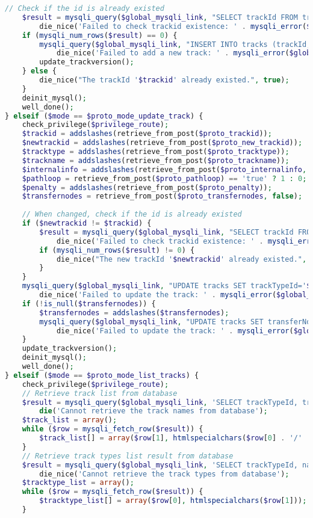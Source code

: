 \begin{lstlisting}[language=PHP,basicstyle=\tiny,caption=handle.php]
	// Check if the id is already existed
	$result = mysqli_query($global_mysqli_link, "SELECT trackId FROM tracks WHERE trackId='$trackid'") or
		die_nice('Failed to check trackid existence: ' . mysqli_error($global_mysqli_link), true);
	if (mysqli_num_rows($result) == 0) {
		mysqli_query($global_mysqli_link, "INSERT INTO tracks (trackId, trackTypeId, trackName, penalty, internalInfo) VALUES ('$trackid','$tracktype','$trackname','$penalty','$internalinfo')") or
			die_nice('Failed to add a new track: ' . mysqli_error($global_mysqli_link), true);
		update_trackversion();
	} else {
		die_nice("The trackId '$trackid' already existed.", true);
	}
	deinit_mysql();
	well_done();
} elseif ($mode == $proto_mode_update_track) {
	check_privilege($privilege_route);
	$trackid = addslashes(retrieve_from_post($proto_trackid));
	$newtrackid = addslashes(retrieve_from_post($proto_new_trackid));
	$tracktype = addslashes(retrieve_from_post($proto_tracktype));
	$trackname = addslashes(retrieve_from_post($proto_trackname));
	$internalinfo = addslashes(retrieve_from_post($proto_internalinfo, false)) or $internalinfo = '';
	$pathloop = retrieve_from_post($proto_pathloop) == 'true' ? 1 : 0;
	$penalty = addslashes(retrieve_from_post($proto_penalty));
	$transfernodes = retrieve_from_post($proto_transfernodes, false);
	
	// When changed, check if the id is already existed
	if ($newtrackid != $trackid) {
		$result = mysqli_query($global_mysqli_link, "SELECT trackId FROM tracks WHERE trackId='$newtrackid'") or
			die_nice('Failed to check trackid existence: ' . mysqli_error($global_mysqli_link), true);
		if (mysqli_num_rows($result) != 0) {
			die_nice("The new trackId '$newtrackid' already existed.", true);
		}
	}
	mysqli_query($global_mysqli_link, "UPDATE tracks SET trackTypeId='$tracktype', trackId='$newtrackid', trackName='$trackname', internalInfo='$internalinfo', pathloop='$pathloop', penalty='$penalty' WHERE trackId='$trackid'") or
		die_nice('Failed to update the track: ' . mysqli_error($global_mysqli_link));
	if (!is_null($transfernodes)) {
		$transfernodes = addslashes($transfernodes);
		mysqli_query($global_mysqli_link, "UPDATE tracks SET transferNodes='$transfernodes'WHERE trackId='$trackid'") or
			die_nice('Failed to update the track: ' . mysqli_error($global_mysqli_link));
	}
	update_trackversion();
	deinit_mysql();
	well_done();
} elseif ($mode == $proto_mode_list_tracks) {
	check_privilege($privilege_route);
	// Retrieve track list from database
	$result = mysqli_query($global_mysqli_link, 'SELECT trackTypeId, trackId, trackName FROM tracks ORDER BY trackTypeId, trackId') or
		die('Cannot retrieve the track names from database');
	$track_list = array();	
	while ($row = mysqli_fetch_row($result)) {
		$track_list[] = array($row[1], htmlspecialchars($row[0] . '/' . $row[2]));
	}
	// Retrieve track types list result from database
	$result = mysqli_query($global_mysqli_link, 'SELECT trackTypeId, name FROM tracktypes ORDER BY trackTypeId') or
		die_nice('Cannot retrieve the track types from database');
	$tracktype_list = array();
	while ($row = mysqli_fetch_row($result)) {
		$tracktype_list[] = array($row[0], htmlspecialchars($row[1]));
	}
	

\end{lstlisting}

